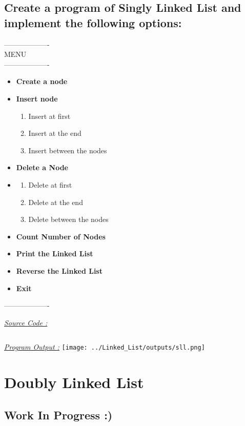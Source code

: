 \documentclass{report}
\begin{document}
\section{Create a program of Singly Linked List and implement the following options:} 
\begin{center}
  ------------------- \\
            MENU \\
  ------------------- \\
  \begin{varwidth}{\textwidth}
    \begin{itemize}
      \item  \textbf {Create a node}
      \item  \textbf {Insert node}
      \begin{enumerate}[label=(\Roman*)]
        \item Insert at first
        \item Insert at the end
        \item Insert between the nodes 
      \end{enumerate}
      \item  \textbf {Delete a Node}
      \item \begin{enumerate}[label=(\Roman*)]
        \item Delete at first
        \item Delete at the end
        \item Delete between the nodes 
      \end{enumerate}
      \item  \textbf {Count Number of Nodes}
      \item  \textbf {Print the Linked List}
      \item  \textbf {Reverse the Linked List}
      \item  \textbf {Exit}
    \end{itemize}
    ------------------- \\
  \end{varwidth}
\end{center}   
\bigbreak
\underline{\emph{\Large Source Code :}}
\inputminted[breaklines]{c}{../Linked_List/singly_linked_list.c}
\bigbreak
\noindent
\underline{\emph{\Large Program Output :}}
\bigbreak
\noindent
\texttt{[image: ../Linked\_List/outputs/sll.png]}

\chapter{Doubly Linked List}
\section{Work In Progress :)} 
\end{document}

